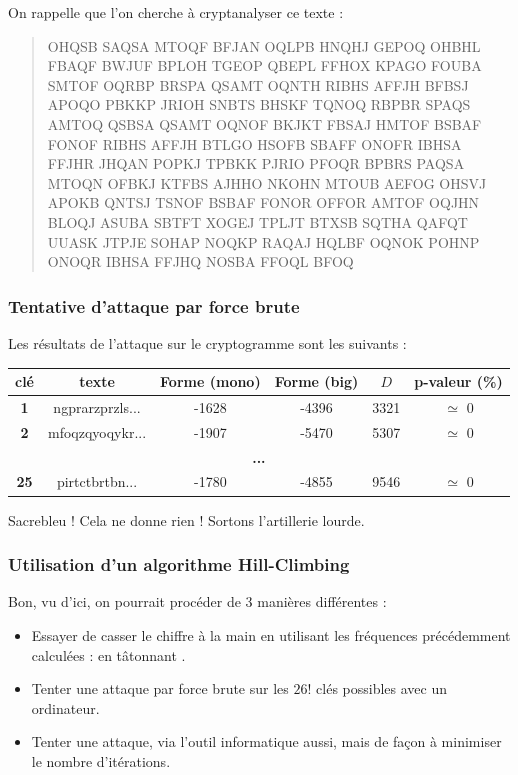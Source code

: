 \documentclass[a4paper, titlepage]{livret}
\begin{document}
On rappelle que l'on cherche à cryptanalyser ce texte :
\begin{center}
\begin{quote}
\og OHQSB SAQSA MTOQF BFJAN OQLPB HNQHJ GEPOQ OHBHL FBAQF BWJUF BPLOH TGEOP QBEPL FFHOX KPAGO FOUBA SMTOF OQRBP BRSPA QSAMT OQNTH RIBHS AFFJH BFBSJ APOQO PBKKP JRIOH SNBTS BHSKF TQNOQ RBPBR SPAQS AMTOQ QSBSA QSAMT OQNOF BKJKT FBSAJ HMTOF BSBAF FONOF RIBHS AFFJH BTLGO HSOFB SBAFF ONOFR IBHSA FFJHR JHQAN POPKJ TPBKK PJRIO PFOQR BPBRS PAQSA MTOQN OFBKJ KTFBS AJHHO NKOHN MTOUB AEFOG OHSVJ APOKB QNTSJ TSNOF BSBAF FONOR OFFOR AMTOF OQJHN BLOQJ ASUBA SBTFT XOGEJ TPLJT BTXSB SQTHA QAFQT UUASK JTPJE SOHAP NOQKP RAQAJ HQLBF OQNOK POHNP ONOQR IBHSA FFJHQ NOSBA FFOQL BFOQ \fg{}
\end{quote}
\end{center}

\subsubsection{Tentative d'attaque par force brute}
Les résultats de l'attaque sur le cryptogramme sont les suivants :
\begin{center}
\begin{tabular}{|c|c|c|c|c|c|}
 \hline
	\textbf{clé}& \textbf{texte} & \textbf{Forme (mono)} & \textbf{Forme (big)} & \textbf{$D$} & \textbf{p-valeur (\%)}\\
	\hline
	\textbf{1} & ngprarzprzls... &   -1628 & -4396 & 3321 & $\simeq$ 0\\
	\hline
	\textbf{2} & mfoqzqyoqykr... &  -1907 & -5470 & 5307 & $\simeq$ 0\\
	\hline
	\multicolumn{6}{|c|}{\textbf{...}}\\
	\hline
	\textbf{25} & pirtctbrtbn... &  -1780 & -4855 & 9546 & $\simeq$ 0\\
	\hline
\end{tabular}
  \label{tab78}
\end{center}
Sacrebleu ! Cela ne donne rien !
Sortons l'artillerie lourde.

\subsubsection{Utilisation d'un algorithme Hill-Climbing}

Bon, vu d'ici, on pourrait procéder de $3$ manières différentes :
\begin{itemize}
\item Essayer de casser le chiffre à la main en utilisant les fréquences précédemment calculées : en \og tâtonnant \fg{}.
\item Tenter une attaque par force brute sur les $26!$ clés possibles avec un ordinateur.
\item Tenter une attaque, via l'outil informatique aussi, mais de façon à minimiser le nombre d'itérations.
\end{itemize}
\end{document}
